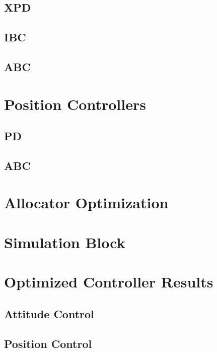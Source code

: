 \subsection{XPD}
\label{subsec:simulation.attitude.xpd}
\subsection{IBC}
\subsection{ABC}
\section{Position Controllers}
\subsection{PD}
\subsection{ABC}
\section{Allocator Optimization}
\label{sec:simulation.allocator}
\section{Simulation Block}
\label{sec:simulation.block}
\section{Optimized Controller Results}
\label{sec:simulation.comparison}
\subsection{Attitude Control}
\label{subsec:simulation.comparison.attitude}
\subsection{Position Control}
\label{subsec:simulation.comparison.position}
